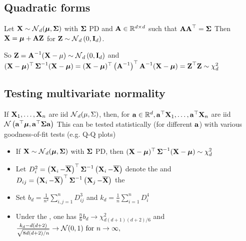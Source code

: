 \subsection*{Quadratic forms}
Let $\vect{X} \sim \N_{d}(\mmu, \mSigma)$ with $\mSigma$ PD and $\vect{A} \in \mathbb{R}^{d \times d}$ such that $\vect{AA}^{\T}=\mSigma$
Then $\vect{X}=\vect{\mmu}+\vect{AZ}$ for $\vect{Z} \sim \N_{d}\left(0, \vect{I}_{d}\right)$. 

So $\vect{Z}=\vect{A}^{-1}(\vect{X}-\mu) \sim \N_{d}\left(0, \vect{I}_{d}\right)$ and
$
(\vect{X}-\mmu)^{\T} \mSigma^{-1}(\vect{X}-\mmu)=(\vect{X}-\mmu)^{\T}\left(\vect{A}^{-1}\right)^{\T} \vect{A}^{-1}(\vect{X}-\mmu)=\vect{Z}^{\T} \vect{Z} \sim \chi_{d}^{2}
$





\subsection*{Testing multivariate normality}
If $\vect{X}_{1}, \ldots, \vect{X}_{n}$ are iid $\N_{d}(\mu, \Sigma)$, then, for $\vect{a} \in \mathbb{R}^{d}, \vect{a}^{\T} \vect{X}_{1}, \ldots, \vect{a}^{\T} \vect{X}_{n}$ are iid $\N\left(\vect{a}^{\T} \vect{\mu}, \vect{a}^{\T} \vect{\Sigma} \vect{a}\right)$ This can be tested statistically (for different $\vect{a}$) with various goodness-of-fit tests (e.g. Q-Q plots)

\begin{itemize}[leftmargin=*]
\item If $\vect{X} \sim \N_{d}(\mmu, \mSigma)$ with $\mSigma$ PD, then $(\vect{X}-\mmu)^{\T} \mSigma^{-1}(\vect{X}-\mmu) \sim \chi_{d}^{2}$
\item Let $D_{i}^{2}=\left(\X_{i}-\bar{\X}\right)^{\top} \mSigma^{-1}\left(\X_{i}-\bar{\X}\right)$ denote the  and $D_{i j}=\left(\X_{i}-\bar{\X}\right)^{\top} \mSigma^{-1}\left(\X_{j}-\bar{\X}\right)$ the 
\item Set
$
b_{d}=\frac{1}{n^{2}} \displaystyle \sum_{i, j=1}^{n} D_{i j}^{3}$ and $k_{d}=\frac{1}{n} \displaystyle \sum_{i=1}^{n} D_{i}^{4}
$
\item Under the , one has
$
\frac{n}{6} b_{d} \rightarrow \chi_{d(d+1)(d+2) / 6}^{2}$ and $ \frac{k_{d}-d(d+2)}{\sqrt{8 d(d+2) / n}} \rightarrow \N(0,1) \text { for } n \rightarrow \infty,
$
\end{itemize}








